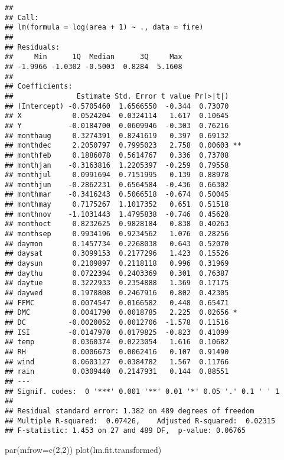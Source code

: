 \documentclass[
]{article}
\newenvironment{Shaded}{\begin{snugshade}}{\end{snugshade}}
\newcommand{\AttributeTok}[1]{\textcolor[rgb]{0.77,0.63,0.00}{#1}}
\newcommand{\DecValTok}[1]{\textcolor[rgb]{0.00,0.00,0.81}{#1}}
\newcommand{\FunctionTok}[1]{\textcolor[rgb]{0.00,0.00,0.00}{#1}}
\newcommand{\NormalTok}[1]{#1}
\begin{document}
\begin{verbatim}
## 
## Call:
## lm(formula = log(area + 1) ~ ., data = fire)
## 
## Residuals:
##     Min      1Q  Median      3Q     Max 
## -1.9966 -1.0302 -0.5003  0.8284  5.1608 
## 
## Coefficients:
##               Estimate Std. Error t value Pr(>|t|)   
## (Intercept) -0.5705460  1.6566550  -0.344  0.73070   
## X            0.0524204  0.0324114   1.617  0.10645   
## Y           -0.0184700  0.0609946  -0.303  0.76216   
## monthaug     0.3274391  0.8241619   0.397  0.69132   
## monthdec     2.2050797  0.7995023   2.758  0.00603 **
## monthfeb     0.1886078  0.5614767   0.336  0.73708   
## monthjan    -0.3163816  1.2205397  -0.259  0.79558   
## monthjul     0.0991694  0.7151995   0.139  0.88978   
## monthjun    -0.2862231  0.6564584  -0.436  0.66302   
## monthmar    -0.3416243  0.5066518  -0.674  0.50045   
## monthmay     0.7175267  1.1017352   0.651  0.51518   
## monthnov    -1.1031443  1.4795838  -0.746  0.45628   
## monthoct     0.8232625  0.9828184   0.838  0.40263   
## monthsep     0.9934196  0.9234562   1.076  0.28256   
## daymon       0.1457734  0.2268038   0.643  0.52070   
## daysat       0.3099153  0.2177296   1.423  0.15526   
## daysun       0.2109897  0.2118118   0.996  0.31969   
## daythu       0.0722394  0.2403369   0.301  0.76387   
## daytue       0.3222933  0.2354888   1.369  0.17175   
## daywed       0.1978808  0.2467916   0.802  0.42305   
## FFMC         0.0074547  0.0166582   0.448  0.65471   
## DMC          0.0041790  0.0018785   2.225  0.02656 * 
## DC          -0.0020052  0.0012706  -1.578  0.11516   
## ISI         -0.0147970  0.0179825  -0.823  0.41099   
## temp         0.0360374  0.0223054   1.616  0.10682   
## RH           0.0006673  0.0062416   0.107  0.91490   
## wind         0.0603127  0.0384782   1.567  0.11766   
## rain         0.0309440  0.2147931   0.144  0.88551   
## ---
## Signif. codes:  0 '***' 0.001 '**' 0.01 '*' 0.05 '.' 0.1 ' ' 1
## 
## Residual standard error: 1.382 on 489 degrees of freedom
## Multiple R-squared:  0.07426,    Adjusted R-squared:  0.02315 
## F-statistic: 1.453 on 27 and 489 DF,  p-value: 0.06765
\end{verbatim}

\begin{Shaded}
\begin{Highlighting}[]
\FunctionTok{par}\NormalTok{(}\AttributeTok{mfrow=}\FunctionTok{c}\NormalTok{(}\DecValTok{2}\NormalTok{,}\DecValTok{2}\NormalTok{))}
\FunctionTok{plot}\NormalTok{(lm.fit.transformed)}
\end{Highlighting}
\end{Shaded}
\end{document}
